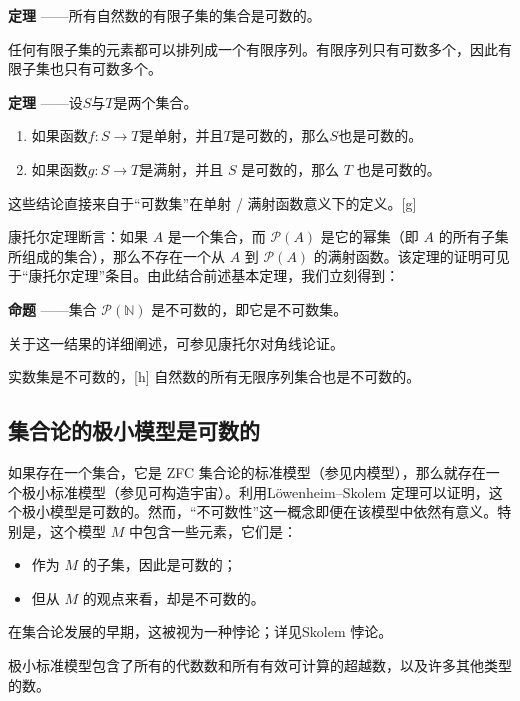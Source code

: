 \textbf{定理} ——所有自然数的有限子集的集合是可数的。

任何有限子集的元素都可以排列成一个有限序列。有限序列只有可数多个，因此有限子集也只有可数多个。

\textbf{定理} ——设$S$与$T$是两个集合。
\begin{enumerate}
\item 如果函数$f : S \to T$是单射，并且$T$是可数的，那么$S$也是可数的。
\item 如果函数$g : S \to T$是满射，并且 $S$ 是可数的，那么 $T$ 也是可数的。
\end{enumerate}

这些结论直接来自于“可数集”在单射 / 满射函数意义下的定义。[g]

康托尔定理断言：如果 $A$ 是一个集合，而 $\mathcal{P}(A)$ 是它的幂集（即 $A$ 的所有子集所组成的集合），那么不存在一个从 $A$ 到 $\mathcal{P}(A)$ 的满射函数。该定理的证明可见于“康托尔定理”条目。由此结合前述基本定理，我们立刻得到：

\textbf{命题} ——集合 $\mathcal{P}(\mathbb{N})$ 是不可数的，即它是不可数集。

关于这一结果的详细阐述，可参见康托尔对角线论证。

实数集是不可数的，[h] 自然数的所有无限序列集合也是不可数的。
\subsection{集合论的极小模型是可数的}
如果存在一个集合，它是 ZFC 集合论的标准模型（参见内模型），那么就存在一个极小标准模型（参见可构造宇宙）。利用Löwenheim–Skolem 定理可以证明，这个极小模型是可数的。然而，“不可数性”这一概念即便在该模型中依然有意义。特别是，这个模型 $M$ 中包含一些元素，它们是：
\begin{itemize}
\item 作为 $M$ 的子集，因此是可数的；
\item 但从 $M$ 的观点来看，却是不可数的。
\end{itemize}
在集合论发展的早期，这被视为一种悖论；详见Skolem 悖论。

极小标准模型包含了所有的代数数和所有有效可计算的超越数，以及许多其他类型的数。
